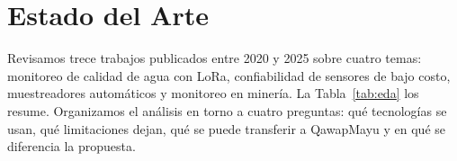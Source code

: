 \section{Estado del Arte}
\label{sec:eda}

Revisamos trece trabajos publicados entre 2020 y 2025 sobre cuatro temas: monitoreo de calidad de agua con LoRa, confiabilidad de sensores de bajo costo, muestreadores automáticos y monitoreo en minería. La Tabla~\ref{tab:eda} los resume. Organizamos el análisis en torno a cuatro preguntas: qué tecnologías se usan, qué limitaciones dejan, qué se puede transferir a QawapMayu y en qué se diferencia la propuesta.


